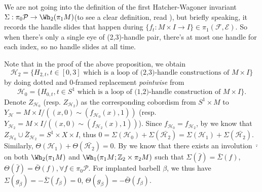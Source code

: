 \begin{remark}
    We are not going into the definition of the first Hatcher-Wagoner invariant $\Sigma:\pi_0\mathcal{P}\to \Wh_2(\pi_1M)$(to see a clear definition, read \cite{singh2022pseudoisotopiesdiffeomorphisms4manifolds}), but briefly speaking, it records the handle slides that happen during $\{f_t: M\times I\to I\}\in \pi_1(\mathcal{F},\mathcal{E})$. So when there's only a single eye of (2,3)-handle pair, there's at most one handle for each index, so no handle slides at all time.
\end{remark}

\begin{remark}
    Note that in the proof of the above proposition, we obtain
    \[
      \mathcal{H}_2=\{H_{2,t},t\in [0,3] \text{ which is a loop of (2,3)-handle constructions of } M\times I\}
    \]
    by doing dotted and 0-framed replacement \emph{pointwise} from
    \[
      \mathcal{H}_0=\{H_{0,t},t\in S^1 \text{ which is a loop of (1,2)-handle construction of }M\times I\}.
    \]
    Denote $Z_{\mathcal{H}_0}$ (resp. $Z_{\mathcal{H}_2}$) as the corresponding cobordism from $S^1\times M$ to $Y_\mathcal{H}=M\times I/((x,0)\sim (f_{\mathcal{H}_0}(x),1))$ (resp. $Y_{\mathcal{H}_2}=M\times I/((x,0)\sim (f_{\mathcal{H}_2}(x),1))$). Since $f_{\mathcal{H}_0}=f_{\mathcal{H}_2}$, by  we know that $Z_{\mathcal{H}_0}\cup \bar{Z}_{\mathcal{H}_2}=S^1\times X\times I$, thus $0=\Sigma(\mathcal{H}_0)+\Sigma(\bar{\mathcal{H}_2})=\Sigma(\mathcal{H}_1)+\Sigma(\bar{\mathcal{H}_2})$. Similarly, $\Theta(\mathcal{H}_1)+\Theta(\bar{\mathcal{H}_2})=0$. By \cite[section 9.1]{singh2022pseudoisotopiesdiffeomorphisms4manifolds} we know that there exists an involution $\bar{\cdot}$ on both $\Wh_2(\pi_1 M)$ and $\Wh_1(\pi_1 M; \mathbb{Z}_2\times \pi_2M)$ such that $\Sigma(\bar{f})=\bar{\Sigma}(f)$, $\Theta(\bar{f})=\bar{\Theta}(f), \forall f\in \pi_0\mathcal{P}$. For implanted barbell $\beta$, we thus have $\Sigma(g_\beta)=-\bar{\Sigma}(f_\beta)=0$, $\Theta(g_\beta)=-\bar{\Theta}(f_\beta)$. 
\end{remark}

